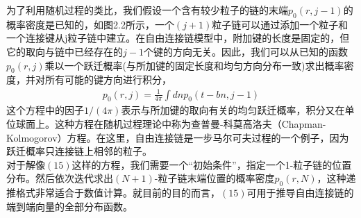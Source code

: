 为了利用随机过程的类比，我们假设一个含有较少粒子的链的末端$p_{0}(r,j-1)$的概率密度是已知的，如图2.2所示，一个$(j+1)$粒子链可以通过添加一个粒子和一个连接键从j粒子链中建立。在自由连接链模型中，附加键的长度是固定的，但它的取向与链中已经存在的$j−1$个键的方向无关。因此，我们可以从已知的函数$p_{0}(r,j)$乘以一个跃迁概率(与所加键的固定长度和均匀方向分布一致)求出概率密度，并对所有可能的键方向进行积分，\\
\begin{gather}
p_{0}(r,j)=\frac{1}{4 \pi} \int dnp_0(t-bn,j-1)
\end{gather}
这个方程中的因子$1/(4 \pi)$表示与所加键的取向有关的均匀跃迁概率，积分又在单位球面上。这种方程在随机过程理论中称为查普曼-科莫高洛夫（Chapman-Kolmogorov）方程。在这里，自由连接链是一步马尔可夫过程的一个例子，因为跃迁概率只连接链上相邻的粒子。\\

对于解像$(15)$这样的方程，我们需要一个“初始条件”，指定一个1-粒子链的位置分布。然后依次迭代求出$(N+1)$-粒子链末端位置的概率密度$p_{0}(r,N)$，这种递推格式非常适合于数值计算。就目前的目的而言，$(15)$可用于推导自由连接链的端到端向量的全部分布函数。\\

